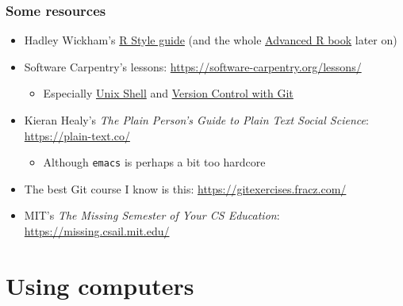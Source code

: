 \documentclass[aspectratio=43]{beamer}
\begin{document}
\begin{frame}
\frametitle{Some resources}
\centering

\begin{itemize}
  \item Hadley Wickham's \href{http://adv-r.had.co.nz/Style.html}{R Style guide} (and the whole \href{http://adv-r.had.co.nz/}{Advanced R book} later on)
  \item Software Carpentry's lessons: \href{https://software-carpentry.org/lessons/}{https://software-carpentry.org/lessons/}
  \begin{itemize}
    \item Especially \href{https://swcarpentry.github.io/shell-novice/}{Unix Shell} and \href{https://swcarpentry.github.io/git-novice/}{Version Control with Git}
  \end{itemize}
  \item Kieran Healy's \textit{The Plain Person’s Guide to Plain Text Social Science}: \href{https://plain-text.co/}{https://plain-text.co/}
  \begin{itemize}
    \item Although \texttt{emacs} is perhaps a bit too hardcore
  \end{itemize}
  \item The best Git course I know is this: \href{https://gitexercises.fracz.com/}{https://gitexercises.fracz.com/}
  \item MIT's \textit{The Missing Semester of Your CS Education}: \href{https://missing.csail.mit.edu/}{https://missing.csail.mit.edu/}
\end{itemize}

\end{frame}

\section{Using computers}
\end{document}
